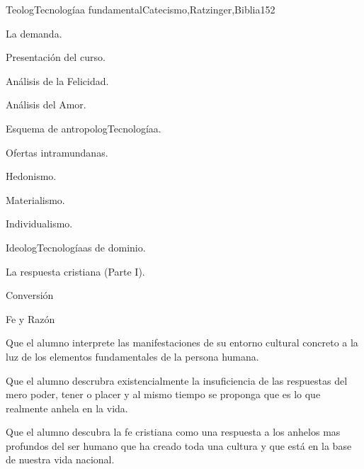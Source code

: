 \begin{syllabus}
\begin{unit}{TeologTecnologíaa fundamental}{Catecismo,Ratzinger,Biblia}{15}{2}
\begin{topics}
	\item La demanda. 
	      \begin{inparaenum}
		    \item Presentación del curso.
		    \item Análisis de la Felicidad.
		    \item Análisis del Amor.
		    \item Esquema de antropologTecnologíaa.
	      \end{inparaenum}
	\item Ofertas intramundanas. 
	      \begin{inparaenum}
		    \item Hedonismo.
		    \item Materialismo.
		    \item Individualismo.
		    \item IdeologTecnologíaas de dominio.
	      \end{inparaenum}
	\item La respuesta cristiana (Parte I). 
	      \begin{inparaenum}
		    \item Conversión
		    \item Fe y Razón
	      \end{inparaenum}
\end{topics}
\begin{learningoutcomes}
	\item Que el alumno interprete las manifestaciones de su entorno cultural concreto a la luz de los elementos fundamentales de la persona humana.
	\item Que el alumno descrubra existencialmente la insuficiencia de las respuestas del mero poder, tener o placer y al mismo tiempo se proponga que es lo que realmente anhela en la vida.
	\item Que el alumno descubra la fe cristiana como una respuesta a los anhelos mas profundos del ser humano que ha creado toda una cultura y que está en la base de nuestra vida nacional.
\end{learningoutcomes}
\end{unit}


\end{syllabus}
